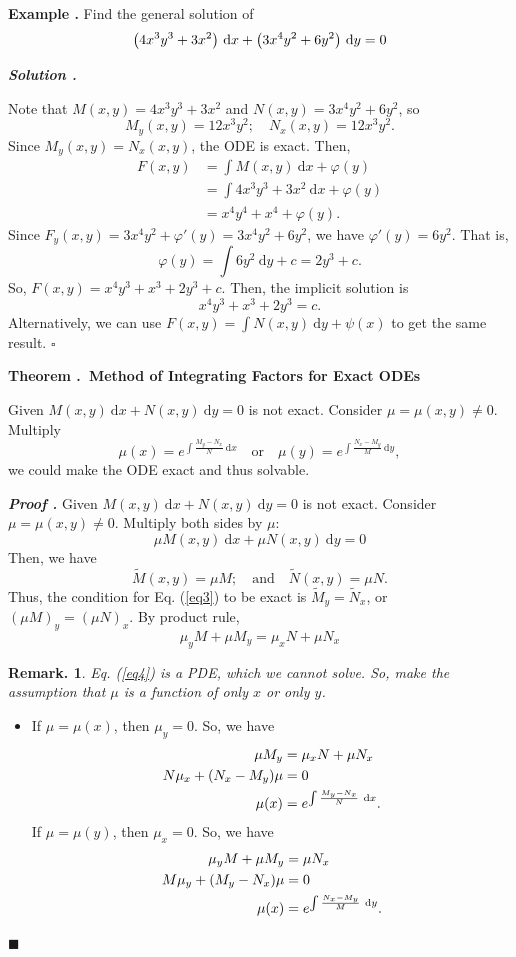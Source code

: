 \documentclass[12pt, a4paper]{article}
\newcounter{index}[subsection]
\newenvironment*{eg}{\begin{framed}\par\noindent\textbf{Example \thesubsection.\stepcounter{index}\theindex}}{\par\end{framed}}
\newenvironment*{thm}[1]{\begin{tcolorbox}\par\noindent\textbf{Theorem \thesubsection.\stepcounter{index}\theindex\ #1} \par}{\par\end{tcolorbox}}
\newcounter{nprf}[subsection]
\newenvironment*{prf}{\par\indent\textbf{\textit{Proof \stepcounter{nprf}\thenprf.}}}{\hfill$\blacksquare$\par}
\newenvironment*{sol}{\par\indent\textbf{\textit{Solution \stepcounter{nprf}\thenprf.}}\par}{\hfill{$\square$}\par}
\newtheorem*{rmk}{Remark.}
\def\d{{\mathrm{d}}}
\def\phi{\varphi}
\def\dsst{\displaystyle}
\begin{document}
\begin{eg}
	Find the general solution of \[\qty(4x^3y^3+3x^2)\ \d{x}+\qty(3x^4y^2+6y^2)\ \d{y}=0\]
	\begin{sol}
		Note that $M(x,y)=4x^3y^3+3x^2$ and $N(x,y)=3x^4y^2+6y^2$, so \[M_y(x,y)=12x^3y^2;\quad N_x(x,y)=12x^3y^2.\] Since $M_y(x,y)=N_x(x,y)$, the ODE is exact. Then, \begin{align*}F(x,y)&=\int M(x,y)\ \d{x}+\phi(y)\\&=\int4x^3y^3+3x^2\ \d{x}+\phi(y)\\&=x^4y^4+x^4+\phi(y).\end{align*} Since $F_y(x,y)=3x^4y^2+\phi'(y)=3x^4y^2+6y^2$, we have $\phi'(y)=6y^2$. That is, \[\phi(y)=\int 6y^2\ \d{y}+c=2y^3+c.\] So, $F(x,y)=x^4y^3+x^3+2y^3+c$. Then, the implicit solution is \[x^4y^3+x^3+2y^3=c.\] Alternatively, we can use $F(x,y)=\dsst\int N(x,y)\ \d{y}+\psi(x)$ to get the same result. 
	\end{sol}
\end{eg}
\begin{thm}{Method of Integrating Factors for Exact ODEs}
	Given $M(x,y)\ \d{x}+N(x,y)\ \d{y}=0$ is not exact. Consider $\mu=\mu(x,y)\neq0$. Multiply \[\mu(x)=e^{\int\frac{M_y-N_x}{N}\ \d{x}}\quad\text{or}\quad\mu(y)=e^{\int\frac{N_x-M_y}{M}\ \d{y}},\] we could make the ODE exact and thus solvable. 
\end{thm}
\begin{prf}
	Given $M(x,y)\ \d{x}+N(x,y)\ \d{y}=0$ is not exact. Consider $\mu=\mu(x,y)\neq0$. Multiply both sides by $\mu$: \begin{equation}\label{eq3}\mu M(x,y)\ \d{x}+\mu N(x,y)\ \d{y}=0\end{equation} Then, we have \[\widetilde{M}(x,y)=\mu M;\quad\text{and}\quad\widetilde{N}(x,y)=\mu N.\] Thus, the condition for Eq. (\ref{eq3}) to be exact is $\widetilde{M}_y=\widetilde{N}_x$, or $(\mu M)_y=(\mu N)_x$. By product rule, \begin{equation}\label{eq4}\mu_y M+\mu M_y=\mu_x N+\mu N_x\end{equation} \begin{rmk} Eq. (\ref{eq4}) is a PDE, which we cannot solve. So, make the assumption that $\mu$ is a function of only $x$ or only $y$. \end{rmk}
	\begin{itemize}
		\item If $\mu=\mu(x)$, then $\mu_y=0$. So, we have \begin{align*}\mu M_y&=\mu_x N+\mu N_x\\N\mu_x+\qty(N_x-M_y)\mu&=0\\\mu(x)&=e^{\int\frac{M_y-N_x}{N}\ \d{x}}.\end{align*}
		If $\mu=\mu(y)$, then $\mu_x=0$. So, we have \begin{align*}\mu_y M+\mu M_y&=\mu N_x\\M\mu_y+\qty(M_y-N_x)\mu&=0\\\mu(x)&=e^{\int\frac{N_x-M_y}{M}\ \d{y}}.\end{align*}
	\end{itemize}
\end{prf}
\end{document}
